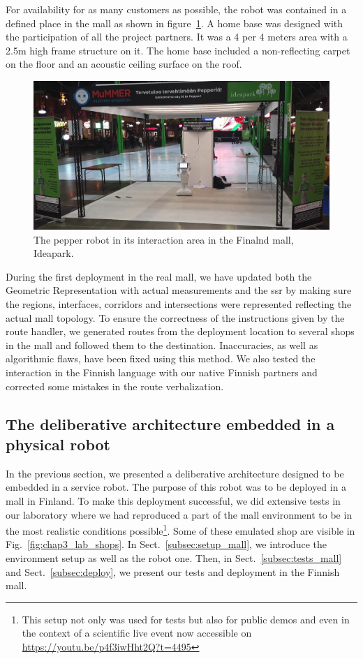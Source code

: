 \documentclass[a4paper,11pt,twoside]{StyleThese}
\begin{document}
For availability for as many customers as possible, the robot was contained in a defined place in the mall as shown in figure~\ref{fig:chap3_pepper_mall}. A home base was designed with the participation of all the project partners. It was a 4 per 4 meters area with a 2.5m high frame structure on it. The home base included a non-reflecting carpet on the floor and an acoustic ceiling surface on the roof.

\begin{figure}[ht!]
	\centering
	\includegraphics[scale=0.2]{figures/chapter3/pepper_mall.png}
	\caption{\label{fig:chap3_pepper_mall} The pepper robot in its interaction area in the Finalnd mall, Ideapark. }
\end{figure}

During the first deployment in the real mall, we have updated both the Geometric Representation with actual measurements and the \acrfull{ssr} by making sure the regions, interfaces, corridors and intersections were represented reflecting the actual mall topology. To ensure the correctness of the instructions given by the route handler, we generated routes from the deployment location to several shops in the mall and followed them to the destination. Inaccuracies, as well as algorithmic flaws, have been fixed using this method. We also tested the interaction in the Finnish language with our native Finnish partners and corrected some mistakes in the route verbalization.

\subsection{The deliberative architecture embedded in a physical robot}\label{subsec:archi-integration}

In the previous section, we presented a deliberative architecture designed to be embedded in a service robot. The purpose of this robot was to be deployed in a mall in Finland. 
To make this deployment successful, we did extensive tests in our laboratory where we had reproduced a part of the mall environment to be in the most realistic conditions possible\footnote{This setup not only was used for tests but also for public demos and even in the context of a scientific live event now accessible on \url{https://youtu.be/p4f3iwHht2Q?t=4495}}. Some of these emulated shop are visible in Fig.~\ref{fig:chap3_lab_shops}. 
In Sect.~\ref{subsec:setup_mall}, we introduce the environment setup as well as the robot one. Then, in Sect.~\ref{subsec:tests_mall} and Sect.~\ref{subsec:deploy}, we present our tests and deployment in the Finnish mall. 
\end{document}
